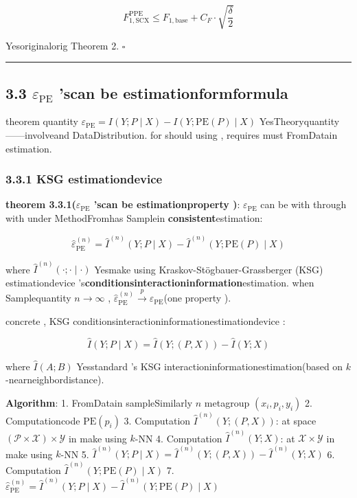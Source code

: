 \documentclass[
  12pt,
]{article}
\begin{document}
\[F_{1,\text{SCX}}^{\text{PPE}} \leq F_{1,\text{base}} + C_F \cdot \sqrt{\frac{\delta}{2}}\]

 Yesoriginalorig Theorem 2. \(\square\)

\begin{center}\rule{0.5\linewidth}{0.5pt}\end{center}

\subsection{\texorpdfstring{3.3 \(\varepsilon_{\text{PE}}\)
'scan be estimationformformula }{3.3 \textbackslash varepsilon\_\{\textbackslash text\{PE\}\} 'scan be estimationformformula }}\label{varepsilon_textpe-ux7684ux53efux4f30ux8ba1ux5f62ux5f0f}

theorem quantity 
\(\varepsilon_{\text{PE}} = I(Y; P \mid X) - I(Y; \text{PE}(P) \mid X)\)
YesTheoryquantity ------involveand DataDistribution. for should using , requires must FromDatain estimation. 

\subsubsection{3.3.1 KSG estimationdevice }\label{ksg-ux4f30ux8ba1ux5668}

\textbf{theorem  3.3.1(\(\varepsilon_{\text{PE}}\)
'scan be estimationproperty )}: \(\varepsilon_{\text{PE}}\)
can be with through with under MethodFromhas Samplein \textbf{consistent}estimation: 

\[\boxed{\hat{\varepsilon}_{\text{PE}}^{(n)} = \hat{I}^{(n)}(Y; P \mid X) - \hat{I}^{(n)}(Y; \text{PE}(P) \mid X)}\]

where \(\hat{I}^{(n)}(\cdot; \cdot \mid \cdot)\) Yesmake using 
Kraskov-Stögbauer-Grassberger (KSG)
estimationdevice 's\textbf{conditionsinteractioninformation}estimation. when Samplequantity  \(n \to \infty\)
, \(\hat{\varepsilon}_{\text{PE}}^{(n)} \xrightarrow{p} \varepsilon_{\text{PE}}\)(one property ). 

concrete , KSG conditionsinteractioninformationestimationdevice : 

\[\hat{I}(Y; P \mid X) = \hat{I}(Y; (P, X)) - \hat{I}(Y; X)\]

where \(\hat{I}(A; B)\) Yesstandard 's KSG interactioninformationestimation(based on  \(k\)-nearneighbordistance). 

\textbf{Algorithm}:  1. FromDatain sampleSimilarly \(n\) metagroup \((x_i, p_i, y_i)\) 2.
Computationcode  \(\text{PE}(p_i)\) 3. Computation
\(\hat{I}^{(n)}(Y; (P, X))\): at space 
\((\mathcal{P} \times \mathcal{X}) \times \mathcal{Y}\) in make using  \(k\)-NN
4. Computation \(\hat{I}^{(n)}(Y; X)\): at  \(\mathcal{X} \times \mathcal{Y}\)
in make using  \(k\)-NN 5.
\(\hat{I}^{(n)}(Y; P \mid X) = \hat{I}^{(n)}(Y; (P, X)) - \hat{I}^{(n)}(Y; X)\)
6. Computation \(\hat{I}^{(n)}(Y; \text{PE}(P) \mid X)\) 7.
\(\hat{\varepsilon}_{\text{PE}}^{(n)} = \hat{I}^{(n)}(Y; P \mid X) - \hat{I}^{(n)}(Y; \text{PE}(P) \mid X)\)
\end{document}
